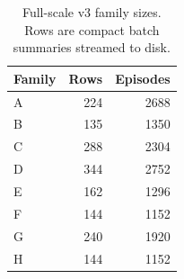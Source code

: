 \begin{table}[t]
\caption{Full-scale v3 family sizes. Rows are compact batch summaries streamed to disk.}
\label{tab:runtime}
\centering
\begin{tabular}{lrr}
\toprule
Family & Rows & Episodes \\
\midrule
A & 224 & 2688 \\
B & 135 & 1350 \\
C & 288 & 2304 \\
D & 344 & 2752 \\
E & 162 & 1296 \\
F & 144 & 1152 \\
G & 240 & 1920 \\
H & 144 & 1152 \\
\bottomrule
\end{tabular}
\end{table}
